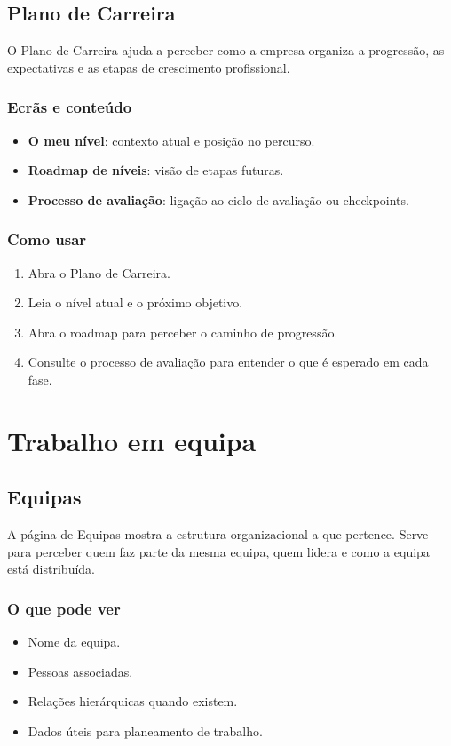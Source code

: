 \section{Plano de Carreira}
O Plano de Carreira ajuda a perceber como a empresa organiza a progressão, as expectativas e as etapas de crescimento profissional.

\subsection{Ecrãs e conteúdo}
\begin{itemize}
  \item \textbf{O meu nível}: contexto atual e posição no percurso.
  \item \textbf{Roadmap de níveis}: visão de etapas futuras.
  \item \textbf{Processo de avaliação}: ligação ao ciclo de avaliação ou checkpoints.
\end{itemize}

\subsection{Como usar}
\begin{enumerate}
  \item Abra o Plano de Carreira.
  \item Leia o nível atual e o próximo objetivo.
  \item Abra o roadmap para perceber o caminho de progressão.
  \item Consulte o processo de avaliação para entender o que é esperado em cada fase.
\end{enumerate}

\chapter{Trabalho em equipa}
\section{Equipas}
A página de Equipas mostra a estrutura organizacional a que pertence. Serve para perceber quem faz parte da mesma equipa, quem lidera e como a equipa está distribuída.

\subsection{O que pode ver}
\begin{itemize}
  \item Nome da equipa.
  \item Pessoas associadas.
  \item Relações hierárquicas quando existem.
  \item Dados úteis para planeamento de trabalho.
\end{itemize}

